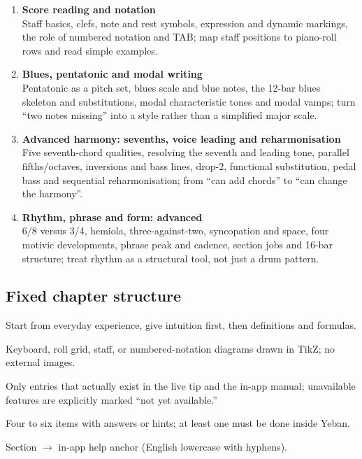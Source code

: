 \begin{enumerate}[label=\textbf{Chapter \arabic*}]
  \item \textbf{Score reading and notation}\\
  Staff basics, clefs, note and rest symbols, expression and dynamic markings, the role of numbered notation and TAB; map staff positions to piano-roll rows and read simple examples.
  \item \textbf{Blues, pentatonic and modal writing}\\
  Pentatonic as a pitch set, blues scale and blue notes, the 12-bar blues skeleton and substitutions, modal characteristic tones and modal vamps; turn ``two notes missing'' into a style rather than a simplified major scale.
  \item \textbf{Advanced harmony: sevenths, voice leading and reharmonisation}\\
  Five seventh-chord qualities, resolving the seventh and leading tone, parallel fifths/octaves, inversions and bass lines, drop-2, functional substitution, pedal bass and sequential reharmonisation; from ``can add chords'' to ``can change the harmony''.
  \item \textbf{Rhythm, phrase and form: advanced}\\
  6/8 versus 3/4, hemiola, three-against-two, syncopation and space, four motivic developments, phrase peak and cadence, section jobs and 16-bar structure; treat rhythm as a structural tool, not just a drum pattern.
\end{enumerate}

\subsection*{Fixed chapter structure}

\begin{description}[leftmargin=2em,style=nextline]
  \item[Concept] Start from everyday experience, give intuition first, then definitions and formulas.
  \item[Score/figure] Keyboard, roll grid, staff, or numbered-notation diagrams drawn in TikZ; no external images.
  \item[How to do it in Yeban] Only entries that actually exist in the live tip and the in-app manual; unavailable features are explicitly marked ``not yet available.''
  \item[Exercises] Four to six items with answers or hints; at least one must be done inside Yeban.
  \item[Help topic map] Section $\rightarrow$ in-app help anchor (English lowercase with hyphens).
\end{description}

